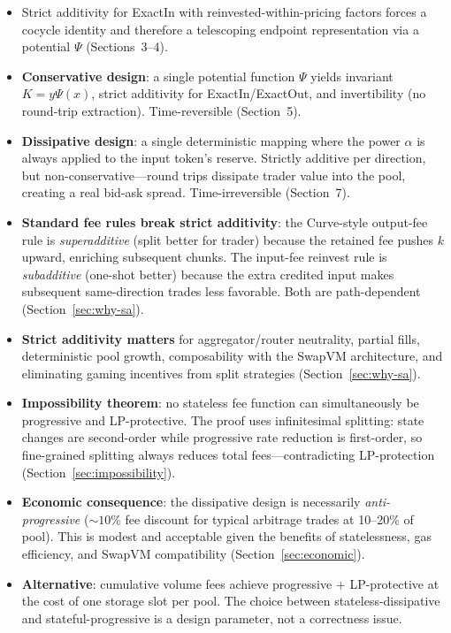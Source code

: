 \documentclass[11pt]{article}
\theoremstyle{definition}
\theoremstyle{remark}
\begin{document}
\begin{itemize}[leftmargin=2em]
\item Strict additivity for ExactIn with reinvested-within-pricing factors forces a cocycle identity and therefore a telescoping endpoint representation via a potential $\Psi$ (Sections~3--4).

\item \textbf{Conservative design}: a single potential function $\Psi$ yields invariant $K=y\Psi(x)$, strict additivity for ExactIn/ExactOut, and invertibility (no round-trip extraction). Time-reversible (Section~5).

\item \textbf{Dissipative design}: a single deterministic mapping where the power $\alpha$ is always applied to the input token's reserve. Strictly additive per direction, but non-conservative---round trips dissipate trader value into the pool, creating a real bid-ask spread. Time-irreversible (Section~7).

\item \textbf{Standard fee rules break strict additivity}: the Curve-style output-fee rule is \emph{superadditive} (split better for trader) because the retained fee pushes $k$ upward, enriching subsequent chunks. The input-fee reinvest rule is \emph{subadditive} (one-shot better) because the extra credited input makes subsequent same-direction trades less favorable. Both are path-dependent (Section~\ref{sec:why-sa}).

\item \textbf{Strict additivity matters} for aggregator/router neutrality, partial fills, deterministic pool growth, composability with the SwapVM architecture, and eliminating gaming incentives from split strategies (Section~\ref{sec:why-sa}).

\item \textbf{Impossibility theorem}: no stateless fee function can simultaneously be progressive and LP-protective. The proof uses infinitesimal splitting: state changes are second-order while progressive rate reduction is first-order, so fine-grained splitting always reduces total fees---contradicting LP-protection (Section~\ref{sec:impossibility}).

\item \textbf{Economic consequence}: the dissipative design is necessarily \emph{anti-progressive} ($\sim\!10\%$ fee discount for typical arbitrage trades at 10--20\% of pool). This is modest and acceptable given the benefits of statelessness, gas efficiency, and SwapVM compatibility (Section~\ref{sec:economic}).

\item \textbf{Alternative}: cumulative volume fees achieve progressive $+$ LP-protective at the cost of one storage slot per pool. The choice between stateless-dissipative and stateful-progressive is a design parameter, not a correctness issue.
\end{itemize}
\end{document}
